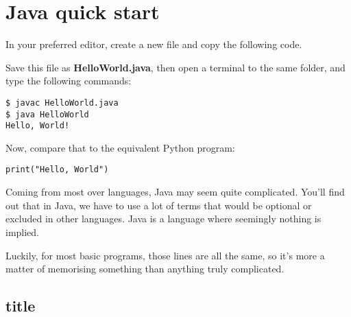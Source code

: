 \section{Java quick start}

	In your preferred editor, create a new file and copy the following code.
	
	
	
	Save this file as \textbf{HelloWorld.java}, then open a terminal to the same folder, and type the following commands:
	
	\begin{lstlisting}[style=Terminal]
$ javac HelloWorld.java
$ java HelloWorld
Hello, World!
	\end{lstlisting}
	
	Now, compare that to the equivalent Python program:
	
	\begin{lstlisting}[style=Python]
	print("Hello, World")
	\end{lstlisting}
	
	Coming from most over languages, Java may seem quite complicated. You'll find out that in Java, we have to use a lot of terms that would be optional or excluded in other languages. Java is a language where seemingly nothing is implied.
	
	Luckily, for most basic programs, those lines are all the same, so it's more a matter of memorising something than anything truly complicated.
	
	\subsection{title}
	
	
	
	